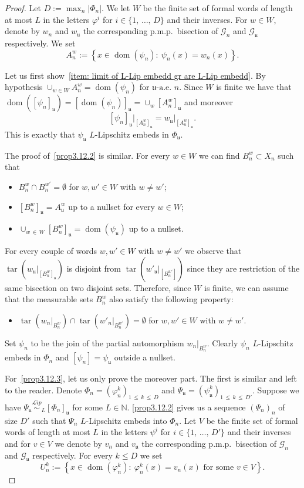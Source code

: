 \documentclass[AHL,Unicode,longabstracts,published]{cedram}
\newcommand{\Nmath}{\mathbb{N}}
\newcommand{\cg}{\mathcal{G}}
\DeclareMathOperator{\dom}{dom}
\DeclareMathOperator{\tar}{tar}
\newcommand{\ul}{\mathfrak{u}}
\newcommand{\ulae}{\mathfrak{u}\textrm{-a.e. }n}
\newcommand{\ph}{\varphi}
\newcommand{\pmp}{p.m.p.\ }
\newcommand\Lipeq{\overset{\mathcal{L}ip}{\sim}}
\begin{document}
\begin{proof}
Let $D:=\max_n |\Phi_n|$. We let $W$ be the finite set of formal words of length at most $L$ in the letters $\ph^i$ for $i\in \{1,\,\ldots,\,D\}$ and their inverses. For $w\in W$, denote by $w_n$ and $w_{\ul}$ the corresponding \pmp bisection of $\cg_n$ and $\cg_\ul$ respectively. We set
\[
A_n^w:=\left\{x\in \dom(\psi_n):\ \psi_n(x)=w_n(x)\right\}.
\]

Let us first show~\eqref{item: limit of L-Lip embedd gr are L-Lip embedd}. By hypothesis $\cup_{w\in W}A_n^w=\dom(\psi_n)$ for $\ulae$. Since $W$ is finite we have that $\dom([\psi_n]_\ul)=[\dom(\psi_n)]_\ul=\cup_w [A_n^w]_\ul$ and moreover
\[
[\psi_n]_\ul\bigr|_{\left[A_n^w\right]_\ul}=w_\ul\bigr|_{\left[A_n^w\right]_\ul}.
\]
This is exactly that $\psi_\ul$ $L$-Lipschitz embeds in $\Phi_\ul$.

The proof of~\eqref{prop3.12.2} is similar. For every $w\in W$ we can find $B_n^w\subset X_n$ such that
\begin{itemize}
\item $B_n^w\cap B_n^{w'}=\emptyset$ for $w,w'\in W$ with $w\neq w'$;
\item $[B_n^w]_\ul= A^w_\ul$ up to a nullset for every $w\in W$;
\item $\cup_{w\,\in\,W} [B_n^w]_\ul=\dom(\psi_\ul)$ up to a nullset.
\end{itemize}
For every couple of words $w,w'\in W$ with $w\neq w'$ we observe that $\tar(w_\ul|_{[B_n^w]_\ul})$ is disjoint from $\tar(w'_\ul|_{[B_n^{w'}]})$ since they are restriction of the same bisection on two disjoint sets. Therefore, since $W$ is finite, we can assume that the measurable sets $B_n^w$ also satisfy the following property:
\begin{itemize}
\item $\tar\left(w_n\bigr|_{B_n^w}\right)\cap\tar\left(w'_n\bigr|_{B_n^{w'}}\right) =\emptyset$ for $w,w'\in W$ with $w\neq w'$.
\end{itemize}

Set $\psi_n$ to be the join of the partial automorphism $w_n\bigr|_{B_n^w}$. Clearly $\psi_n$ $L$-Lipschitz embeds in $\Phi_n$ and $[\psi_n]=\psi_\ul$ outside a nullset.

For~\eqref{prop3.12.3}, let us only prove the moreover part. The first is similar and left to the reader. Denote $\Phi_n = (\ph_n^k)_{1\,\leq\,k\,\leq\, D}$ and $\Psi_\ul = (\psi_\ul^k)_{1\,\leq\,k\,\leq\,D'}$. Suppose we have $\Psi_\ul\Lipeq_L [\Phi_n]_\ul$ for some $L\in\Nmath$. \eqref{prop3.12.2} gives us a sequence $(\Psi_n)_n$ of size $D'$ such that $\Psi_n$ $L$-Lipschitz embeds into $\Phi_n$. Let $V$ be the finite set of formal words of length at most $L$ in the letters $\psi^i$ for $i\in \{1,\,\ldots,\,D'\}$ and their inverses and for $v\in V$ we denote by $v_n$ and $v_{\ul}$ the corresponding \pmp bisection of $\cg_n$ and $\cg_\ul$ respectively. For every $k \leq D$ we set
\[
U^k_n:=\left\{x\in\dom\left(\ph^k_n\right):\ \ph^k_n(x)=v_n(x)\text{ for some }v\in V\right\}.
\]


\end{proof}
\end{document}
